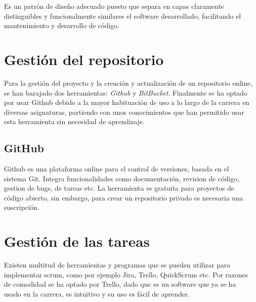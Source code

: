 Es un patrón de diseño adecuado puesto que separa en capas claramente distinguibles y funcionalmente similares el software desarrollado, facilitando el mantenimiento y desarrollo de código.

\section{Gestión del repositorio}
Para la gestión del proyecto y la creación y actualización de un repositorio online, se han barajado dos herramientas: \emph{Github} y \emph{BitBucket}.
Finalmente se ha optado por usar Github debido a la mayor habituación de uso a lo largo de la carrera en diversas asignaturas, partiendo con unos conocimientos que han permitido usar esta herramienta sin necesidad de aprendizaje.
\subsection{GitHub}
Github es una plataforma online para el control de versiones, basada en el sistema Git. Integra funcionalidades como documentación, revision de código, gestion de bugs, de tareas etc.
La herramienta es gratuita para proyectos de código abierto, sin embargo, para crear un repositorio privado es necesaria una suscripción.

\section{Gestión de las tareas}
Existen multitud de herramientas y programas que se pueden utilizar para implementar scrum, como por ejemplo Jira, Trello, QuickScrum etc.
Por razones de comodidad se ha optado por Trello, dado que es un software que ya se ha usado en la carrera, es intuitivo y su uso es fácil de aprender.


